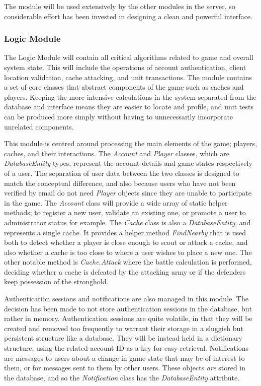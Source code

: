 The module will be used extensively by the other modules in the server, so considerable effort has been invested in designing a clean and powerful interface.

\subsubsection{Logic Module}
The Logic Module will contain all critical algorithms related to game and overall system state. This will include the operations of account authentication, client location validation, cache attacking, and unit transactions. The module contains a set of core classes that abstract components of the game such as caches and players. Keeping the more intensive calculations in the system separated from the database and interface means they are easier to locate and profile, and unit tests can be produced more simply without having to unnecessarily incorporate unrelated components.

This module is centred around processing the main elements of the game; players, caches, and their interactions. The \emph{Account} and \emph{Player} classes, which are \emph{DatabaseEntity} types, represent the account details and game states respectively of a user. The separation of user data between the two classes is designed to match the conceptual difference, and also because users who have not been verified by email do not need \emph{Player} objects since they are unable to participate in the game. The \emph{Account} class will provide a wide array of static helper methods; to register a new user, validate an existing one, or promote a user to administrator status for example. The \emph{Cache} class is also a \emph{DatabaseEntity}, and represents a single cache. It provides a helper method \emph{FindNearby} that is used both to detect whether a player is close enough to scout or attack a cache, and also whether a cache is too close to where a user wishes to place a new one. The other notable method is \emph{Cache.Attack} where the battle calculation is performed, deciding whether a cache is defeated by the attacking army or if the defenders keep possession of the stronghold.

Authentication sessions and notifications are also managed in this module. The decision has been made to not store authentication sessions in the database, but rather in memory. Authentication sessions are quite volatile, in that they will be created and removed too frequently to warrant their storage in a sluggish but persistent structure like a database. They will be instead held in a dictionary structure, using the related account ID as a key for easy retrieval. Notifications are messages to users about a change in game state that may be of interest to them, or for messages sent to them by other users. These objects \emph{are} stored in the database, and so the \emph{Notification} class has the \emph{DatabaseEntity} attribute.

